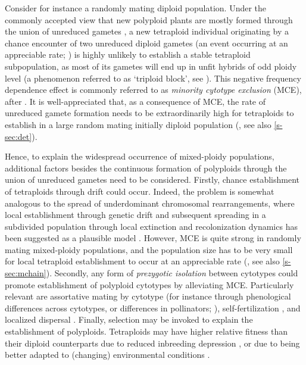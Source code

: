 \documentclass[12pt,a4paper]{article}
\begin{document}
Consider for instance a randomly mating diploid population.
Under the commonly accepted view that new polyploid plants are mostly formed
through the union of unreduced gametes
\citep{bretagnolle1995,herben2016,kreiner2017b}, a new tetraploid individual
originating by a chance encounter of two unreduced diploid gametes (an event
occurring at an appreciable rate; \cite{kreiner2017}) is highly unlikely to
establish a stable tetraploid subpopulation, as most of its gametes will end up
in unfit hybrids of odd ploidy level (a phenomenon referred to as `triploid
block', see \cite{ramsey1998,kohler2010,brown2024}).
This negative frequency dependence effect is commonly referred to as
\textit{minority cytotype exclusion} (MCE), after \cite{levin1975}.
It is well-appreciated that, as a consequence of MCE, the rate of unreduced
gamete formation needs to be extraordinarily high for tetraploids to establish
in a large random mating initially diploid population (\cite{felber1997}, see
also \cref{s-sec:det}).

Hence, to explain the widespread occurrence of mixed-ploidy populations,
additional factors besides the continuous formation of polyploids through the
union of unreduced gametes need to be considered.
Firstly, chance establishment of tetraploids through drift could occur.
Indeed, the problem is somewhat analogous to the spread of underdominant
chromosomal rearrangements, where local establishment through genetic drift and
subsequent spreading in a subdivided population through local extinction and 
recolonization dynamics has been suggested as a plausible model
\citep{lande1985}.
However, MCE is quite strong in randomly mating mixed-ploidy populations, and
the population size has to be very small for local tetraploid establishment to
occur at an appreciable rate (\cite{rausch2005}, see also \cref{s-sec:mchain}).
Secondly, any form of \textit{prezygotic isolation} between cytotypes could
promote establishment of polyploid cytotypes by alleviating MCE.
Particularly relevant are assortative mating by cytotype  (for instance through
phenological differences across cytotypes, or differences in pollinators;
\cite{kolar2017}), self-fertilization \citep{rausch2005,novikova2023}, and
localized dispersal \citep{baack2005,kolar2017}.
Finally, selection may be invoked to explain the establishment of polyploids.
Tetraploids may have higher relative fitness than their diploid counterparts
due to reduced inbreeding depression \citep{ronfort1999,otto2000}, or due to being
better adapted to (changing) environmental conditions \citep{vandepeer2021}. 
\end{document}
